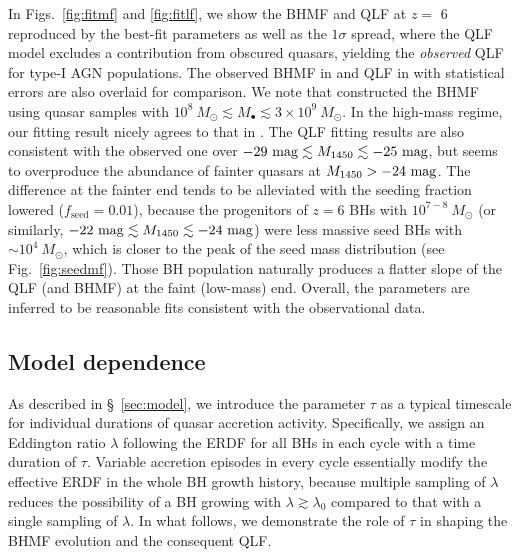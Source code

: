 \documentclass[twocolumn, twocolappendix]{aastex63}
\newcommand{\Msun}{M_\odot}
\newcommand{\Mbh}{M_\bullet}
\newcommand{\tlife}{\tau}
\newcommand{\fseed}{f_\mathrm{seed}}
\newcommand{\Muv}{M_{1450}}
\begin{document}
\begin{CJK*}{UTF8}{gbsn}
In Figs.~\ref{fig:fitmf} and \ref{fig:fitlf}, we show the BHMF and QLF at $z=$ 6 reproduced by the best-fit parameters
as well as the $1\sigma$ spread, where the QLF model excludes a contribution from obscured quasars, 
yielding the {\it observed} QLF for type-I AGN populations.
The observed BHMF in  and QLF in  
with statistical errors are also overlaid for comparison.
We note that  constructed the BHMF using quasar samples with 
$10^8~\Msun \lesssim \Mbh \lesssim 3\times 10^9~\Msun$.
In the high-mass regime, our fitting result nicely agrees to that in .
The QLF fitting results are also consistent with the observed one over $-29~{\rm mag} \lesssim \Muv \lesssim -25~{\rm mag}$,
but seems to overproduce the abundance of fainter quasars at $\Muv>-24~{\rm mag}$.
The difference at the fainter end tends to be alleviated with the seeding fraction lowered ($\fseed = 0.01$),
because the progenitors of $z=6$ BHs with $10^{7-8}~\Msun$ (or similarly, 
$-22~{\rm mag} \lesssim \Muv \lesssim -24~{\rm mag}$) were less massive seed BHs with $\sim 10^4~\Msun$,
which is closer to the peak of the seed mass distribution (see Fig.~\ref{fig:seedmf}).
Those BH population naturally produces a flatter slope of the QLF (and BHMF) at the faint (low-mass) end.
Overall, the parameters are inferred to be reasonable fits consistent with the observational data.



\vspace{2mm}
\subsection{Model dependence}\label{sec:modep}
As described in \S~\ref{sec:model}, we introduce the parameter $\tau$ as a typical timescale
for individual durations of quasar accretion activity.
Specifically, we assign an Eddington ratio $\lambda$ following the ERDF for all BHs in each cycle
with a time duration of $\tau$.
Variable accretion episodes in every cycle essentially modify the effective ERDF in the whole BH growth history,
because multiple sampling of $\lambda$ reduces the possibility of a BH growing with $\lambda \gtrsim \lambda_0$
compared to that with a single sampling of $\lambda$.
In what follows, we demonstrate the role of $\tlife$ in shaping the BHMF evolution and the consequent QLF.


\end{CJK*}
\end{document}
